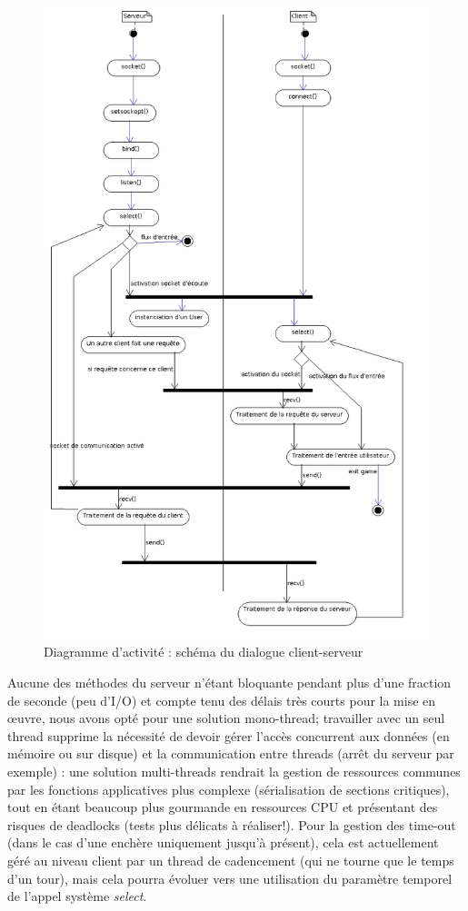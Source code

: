 \documentclass[a4paper,titlepage]{scrreprt}
\begin{document}
    \begin{figure}[H]
    \center
    \includegraphics[scale=0.45]{uml/Clientserveur.png}
    \caption{Diagramme d'activité : schéma du dialogue client-serveur} \label{diag-serveur}
    \end{figure}
Aucune des méthodes du serveur n'étant bloquante pendant plus d'une fraction de seconde (peu d'I/O) et compte tenu des délais très courts pour la mise en œuvre, nous avons opté pour une solution mono-thread;
travailler avec un seul thread supprime la nécessité de devoir gérer l'accès concurrent aux données (en mémoire ou sur disque) et la communication entre threads (arrêt du serveur par exemple) :
une solution multi-threads rendrait la gestion de ressources communes par les fonctions applicatives plus complexe (sérialisation de sections critiques), 
tout en étant beaucoup plus gourmande en ressources CPU et présentant des risques de deadlocks (tests plus délicats à réaliser!). 
Pour la gestion des time-out (dans le cas d'une enchère uniquement jusqu'à présent), 
cela est actuellement géré au niveau client par un thread de cadencement (qui ne tourne que le temps d'un tour),
mais cela pourra évoluer vers une utilisation du paramètre temporel de l'appel système \emph{select}.
\end{document}
